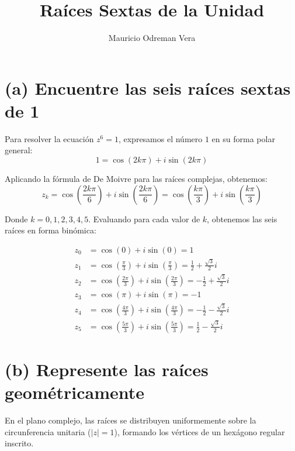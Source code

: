 \documentclass{article}
\title{Raíces Sextas de la Unidad}
\author{Mauricio Odreman Vera}
\date{}
\begin{document}
	
	\maketitle
	
	\section*{(a) Encuentre las seis raíces sextas de 1}
	
	Para resolver la ecuación $z^6 = 1$, expresamos el número $1$ en su forma polar general:
	\[ 1 = \cos(2k\pi) + i\sin(2k\pi) \]
	
	Aplicando la fórmula de De Moivre para las raíces complejas, obtenemos:
	\[ z_k = \cos\left(\frac{2k\pi}{6}\right) + i\sin\left(\frac{2k\pi}{6}\right) = \cos\left(\frac{k\pi}{3}\right) + i\sin\left(\frac{k\pi}{3}\right) \]
	
	Donde $k = 0, 1, 2, 3, 4, 5$. Evaluando para cada valor de $k$, obtenemos las seis raíces en forma binómica:
	
	\begin{align*}
		z_0 &= \cos(0) + i\sin(0) = 1 \\
		z_1 &= \cos\left(\frac{\pi}{3}\right) + i\sin\left(\frac{\pi}{3}\right) = \frac{1}{2} + \frac{\sqrt{3}}{2}i \\
		z_2 &= \cos\left(\frac{2\pi}{3}\right) + i\sin\left(\frac{2\pi}{3}\right) = -\frac{1}{2} + \frac{\sqrt{3}}{2}i \\
		z_3 &= \cos(\pi) + i\sin(\pi) = -1 \\
		z_4 &= \cos\left(\frac{4\pi}{3}\right) + i\sin\left(\frac{4\pi}{3}\right) = -\frac{1}{2} - \frac{\sqrt{3}}{2}i \\
		z_5 &= \cos\left(\frac{5\pi}{3}\right) + i\sin\left(\frac{5\pi}{3}\right) = \frac{1}{2} - \frac{\sqrt{3}}{2}i
	\end{align*}
	
	\section*{(b) Represente las raíces geométricamente}
	
	En el plano complejo, las raíces se distribuyen uniformemente sobre la circunferencia unitaria ($|z| = 1$), formando los vértices de un hexágono regular inscrito.
	
\end{document}
